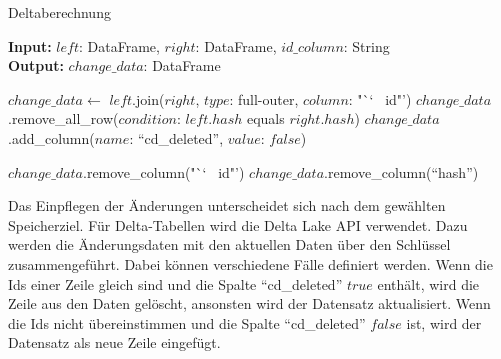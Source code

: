 \begin{algorithm}
    \caption{Deltaberechnung}
    \label{algo:delta-calc}
    \textbf{Input:} $left$: DataFrame, $right$: DataFrame, $id\_column$: String  \\
    \textbf{Output:} $change\_data$: DataFrame \\


    $change\_data \gets$ $left$.join($right$, $type$: full-outer, $column$: "`\char`~ id"')\;
    $change\_data$.remove\_all\_row($condition$: $left.hash$ equals $right.hash$)\;
    $change\_data$.add\_column($name$: "`cd\_deleted"', $value$: $false$)\;


    $change\_data$.remove\_column("`\char`~ id"')\;
    $change\_data$.remove\_column("`hash"')\;

\end{algorithm}

Das Einpflegen der Änderungen unterscheidet sich nach dem gewählten Speicherziel.
Für Delta-Tabellen wird die Delta Lake API verwendet.
Dazu werden die Änderungsdaten mit den aktuellen Daten über den Schlüssel zusammengeführt.
Dabei können verschiedene Fälle definiert werden.
Wenn die Ids einer Zeile gleich sind und die Spalte "`cd\_deleted"' $true$ enthält, wird die Zeile aus den Daten gelöscht, ansonsten wird der Datensatz aktualisiert.
Wenn die Ids nicht übereinstimmen und die Spalte "`cd\_deleted"' $false$ ist, wird der Datensatz als neue Zeile eingefügt.

